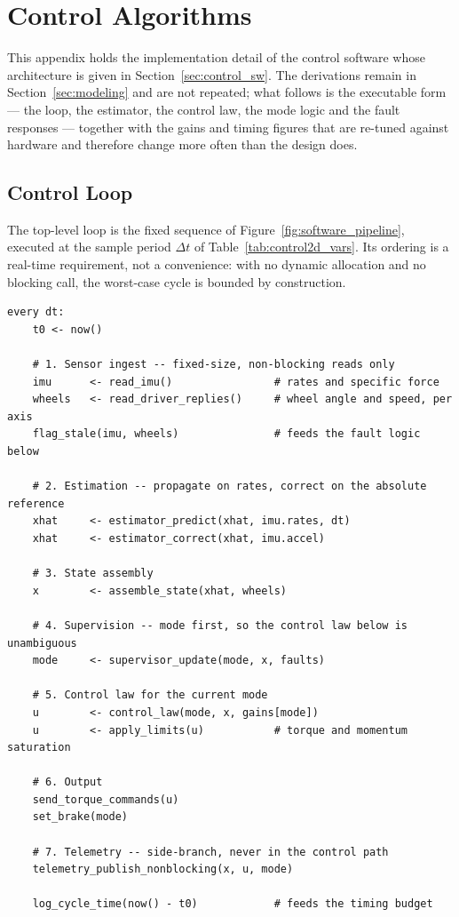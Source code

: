 \section{Control Algorithms}
\label{app:control_algorithms}

This appendix holds the implementation detail of the control software whose
architecture is given in Section~\ref{sec:control_sw}. The derivations remain in
Section~\ref{sec:modeling} and are not repeated; what follows is the executable
form --- the loop, the estimator, the control law, the mode logic and the fault
responses --- together with the gains and timing figures that are re-tuned
against hardware and therefore change more often than the design does.

\subsection{Control Loop}
\label{app:loop}

The top-level loop is the fixed sequence of Figure~\ref{fig:software_pipeline},
executed at the sample period $\Delta t$ of
Table~\ref{tab:control2d_vars}. Its ordering is a real-time requirement, not a
convenience: with no dynamic allocation and no blocking call, the worst-case
cycle is bounded by construction.

\begin{verbatim}
every dt:
    t0 <- now()

    # 1. Sensor ingest -- fixed-size, non-blocking reads only
    imu      <- read_imu()                # rates and specific force
    wheels   <- read_driver_replies()     # wheel angle and speed, per axis
    flag_stale(imu, wheels)               # feeds the fault logic below

    # 2. Estimation -- propagate on rates, correct on the absolute reference
    xhat     <- estimator_predict(xhat, imu.rates, dt)
    xhat     <- estimator_correct(xhat, imu.accel)

    # 3. State assembly
    x        <- assemble_state(xhat, wheels)

    # 4. Supervision -- mode first, so the control law below is unambiguous
    mode     <- supervisor_update(mode, x, faults)

    # 5. Control law for the current mode
    u        <- control_law(mode, x, gains[mode])
    u        <- apply_limits(u)           # torque and momentum saturation

    # 6. Output
    send_torque_commands(u)
    set_brake(mode)

    # 7. Telemetry -- side-branch, never in the control path
    telemetry_publish_nonblocking(x, u, mode)

    log_cycle_time(now() - t0)            # feeds the timing budget
\end{verbatim}


